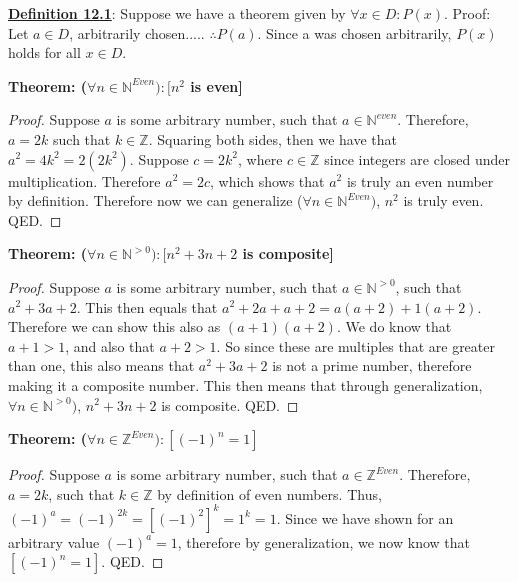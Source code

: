 \textbf{\underline{Definition 12.1}}: Suppose we have a theorem given by $\forall x \in D : P(x)$. Proof: Let $a \in D$, arbitrarily chosen..... $\therefore P(a)$. Since a was chosen arbitrarily, $P(x)$ holds for all $x \in D$.

\begin{example}
    \textbf{Theorem: ($\forall n \in \mathbb{N}^{Even}) : [n^2$ is even]}
\end{example}

\begin{proof}
    Suppose $a$ is some arbitrary number, such that $a \in \mathbb{N}^{even}$. Therefore, $a = 2k$ such that $k \in \mathbb{Z}$. Squaring both sides, then we have that $a^2=4k^2=2(2k^2)$. Suppose $c = 2k^2$, where $c \in \mathbb{Z}$ since integers are closed under multiplication. Therefore $a^2=2c$, which shows that $a^2$ is truly an even number by definition. Therefore now we can generalize ($\forall n \in \mathbb{N}^{Even})$, $n^2$ is truly even. QED.
\end{proof}

\begin{example}
    \textbf{Theorem: ($\forall n \in \mathbb{N}^{>0}) : [n^2+3n+2$ is composite]}
\end{example}

\begin{proof}
    Suppose $a$ is some arbitrary number, such that $a \in \mathbb{N}^{>0}$, such that $a^2+3a+2$. This then equals that $a^2+2a+a+2=a(a+2)+1(a+2)$. Therefore we can show this also as $(a+1)(a+2)$. We do know that $a+1>1$, and also that $a+2>1$. So since these are multiples that are greater than one, this also means that $a^2+3a+2$ is not a prime number, therefore making it a composite number. This then means that through generalization, $\forall n \in \mathbb{N}^{>0})$, $n^2+3n+2$ is composite. QED.
\end{proof}

\begin{example}
    \textbf{Theorem: ($\forall n \in \mathbb{Z}^{Even}) : [(-1)^n=1]$}
\end{example}

\begin{proof}
    Suppose $a$ is some arbitrary number, such that $a \in \mathbb{Z}^{Even}$. Therefore, $a=2k$, such that $k \in \mathbb{Z}$ by definition of even numbers. Thus, $(-1)^a=(-1)^{2k}=[(-1)^2]^k=1^k=1$. Since we have shown for an arbitrary value $(-1)^a=1$, therefore by generalization, we now know that $[(-1)^n=1]$. QED.
\end{proof}

